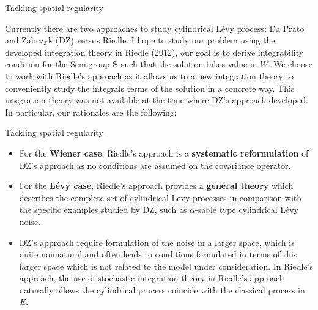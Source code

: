 \documentclass[xcolor=dvipsnames,leqno]{beamer}
\begin{document}
\begin{omitframe}
\begin{frame}{Tackling spatial regularity}
\begin{spacing}{1.5}
Currently there are two approaches to study cylindrical L\'evy process: Da Prato and Zabczyk (DZ) versus Riedle. I hope to study our problem using the developed integration theory in Riedle (2012), our goal is to derive integrability condition for the Semigroup $\mathbf{S}$ such that the solution takes value in $W$. We choose to work with Riedle's approach as it allows us to a new integration theory to conveniently study the integrals terms of the solution in a concrete way. This integration theory was not available at the time where DZ's approach developed. In particular, our rationales are the following:
\end{spacing}     
\end{frame}
\begin{frame}{Tackling spatial regularity}
	\begin{itemize}
		\item For the \textbf{Wiener case}, Riedle's approach is a \textbf{systematic reformulation} of DZ's approach as no conditions are assumed on the covariance operator.
		\item For the \textbf{L\'evy case}, Riedle's approach provides a \textbf{general theory} which describes the complete set of cylindrical Levy processes in comparison with the specific examples studied by DZ, such as $\alpha$-sable type cylindrical L\'evy noise.
		\item DZ's approach require formulation of the noise in a larger space, which is quite nonnatural and often leads to conditions formulated in terms of this larger space which is not related to the model under consideration. In Riedle's approach,  the use of stochastic integration theory in Riedle's approach naturally allows the cylindrical process coincide with the classical process in $E$.
	\end{itemize}
\end{frame}
\end{omitframe}   
\end{document}

